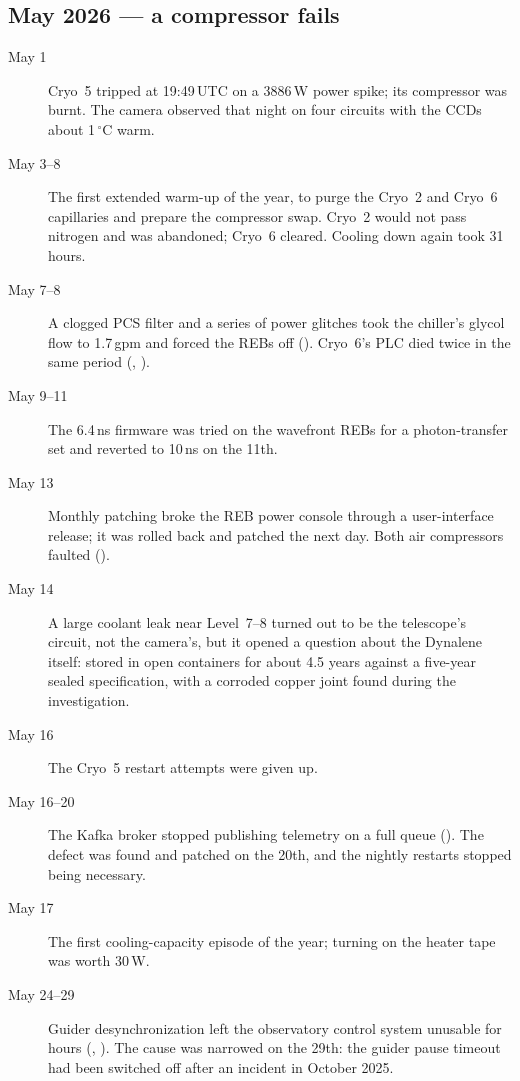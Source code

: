 \subsection{May 2026 --- a compressor fails}
\begin{description}

\item[May 1] Cryo~5 tripped at 19:49\,UTC on a 3886\,W power spike;
  its compressor was burnt.  The camera observed that night on four
  circuits with the CCDs about 1\,$^{\circ}$C warm.

\item[May 3--8] The first extended warm-up of the year, to purge the
  Cryo~2 and Cryo~6 capillaries and prepare the compressor swap.
  Cryo~2 would not pass nitrogen and was abandoned; Cryo~6 cleared.
  Cooling down again took 31 hours.

\item[May 7--8] A clogged PCS filter and a series of power glitches
  took the chiller's glycol flow to 1.7\,gpm and forced the REBs off
  ().  Cryo~6's PLC died twice in the same period
  (, ).

\item[May 9--11] The 6.4\,ns firmware was tried on the wavefront REBs
  for a photon-transfer set and reverted to 10\,ns on the 11th.

\item[May 13] Monthly patching broke the REB power console through a
  user-interface release; it was rolled back and patched the next day.
  Both air compressors faulted ().

\item[May 14] A large coolant leak near Level~7--8 turned out to be the
  telescope's circuit, not the camera's, but it opened a question about
  the Dynalene itself: stored in open containers for about 4.5 years
  against a five-year sealed specification, with a corroded copper
  joint found during the investigation.

\item[May 16] The Cryo~5 restart attempts were given up.

\item[May 16--20] The Kafka broker stopped publishing telemetry on a
  full queue ().  The defect was found and
  patched on the 20th, and the nightly restarts stopped being
  necessary.

\item[May 17] The first cooling-capacity episode of the year; turning on
  the heater tape was worth 30\,W.

\item[May 24--29] Guider desynchronization left the observatory control
  system unusable for hours (,
  ).  The cause was narrowed on the 29th: the guider
  pause timeout had been switched off after an incident in October
  2025.

\end{description}


